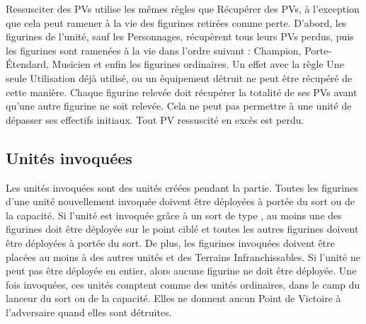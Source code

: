 Ressusciter des PVs utilise les mêmes règles que Récupérer des PVs, à l'exception que cela peut ramener à la vie des figurines retirées comme perte. D'abord, les figurines de l'unité, sauf les Personnages, récupèrent tous leurs PVs perdus, puis les figurines sont ramenées à la vie dans l'ordre suivant : Champion, Porte-Étendard, Musicien et enfin les figurines ordinaires.  Un effet avec la règle Une seule Utilisation déjà utilisé, ou un équipement détruit ne peut être récupéré de cette manière. Chaque figurine relevée doit récupérer la totalité de ses PVs avant qu'une autre figurine ne soit relevée. Cela ne peut pas permettre à une unité de dépasser ses effectifs initiaux. Tout PV ressuscité en excès est perdu.

\subsection{Unités invoquées}

Les unités invoquées sont des unités créées pendant la partie. Toutes les figurines d'une unité nouvellement invoquée doivent être déployées à portée du sort ou de la capacité. Si l'unité est invoquée grâce à un sort de type \ground{}, au moins une des figurines doit être déployée sur le point ciblé et toutes les autres figurines doivent être déployées à portée du sort. De plus, les figurines invoquées doivent être placées au moins à  des autres unités et des Terrains Infranchissables. Si l'unité ne peut pas être déployée en entier, alors aucune figurine ne doit être déployée. Une fois invoquées, ces unités comptent comme des unités ordinaires, dans le camp du lanceur du sort ou de la capacité. Elles ne donnent aucun Point de Victoire à l'adversaire quand elles sont détruites.
